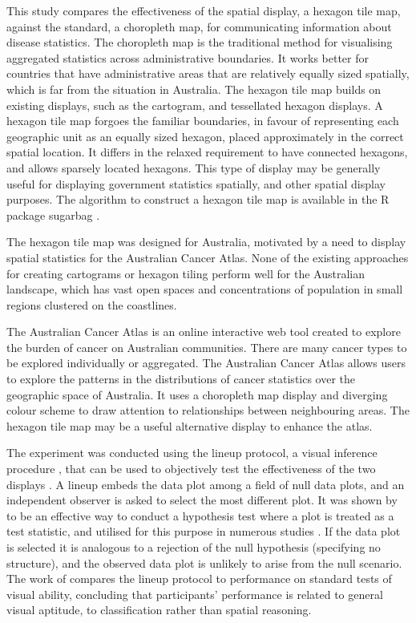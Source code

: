 \documentclass[
doublespace,
  times]{anzsauth}
\begin{document}
This study compares the effectiveness of the spatial display, a hexagon
tile map, against the standard, a choropleth map, for communicating
information about disease statistics. The choropleth map is the
traditional method for visualising aggregated statistics across
administrative boundaries. It works better for countries that have
administrative areas that are relatively equally sized spatially, which
is far from the situation in Australia. The hexagon tile map builds on
existing displays, such as the cartogram, and tessellated hexagon
displays. A hexagon tile map forgoes the familiar boundaries, in favour
of representing each geographic unit as an equally sized hexagon, placed
approximately in the correct spatial location. It differs in the relaxed
requirement to have connected hexagons, and allows sparsely located
hexagons. This type of display may be generally useful for displaying
government statistics spatially, and other spatial display purposes. The
algorithm to construct a hexagon tile map is available in the \textsf{R}
package \textsf{sugarbag} \citep{sugarbag}.

The hexagon tile map was designed for Australia, motivated by a need to
display spatial statistics for the Australian Cancer Atlas. None of the
existing approaches for creating cartograms or hexagon tiling perform
well for the Australian landscape, which has vast open spaces and
concentrations of population in small regions clustered on the
coastlines.

The Australian Cancer Atlas \citep{atlas} is an online interactive web
tool created to explore the burden of cancer on Australian communities.
There are many cancer types to be explored individually or aggregated.
The Australian Cancer Atlas allows users to explore the patterns in the
distributions of cancer statistics over the geographic space of
Australia. It uses a choropleth map display and diverging colour scheme
to draw attention to relationships between neighbouring areas. The
hexagon tile map may be a useful alternative display to enhance the
atlas.

The experiment was conducted using the lineup protocol, a visual
inference procedure \citep{BCHLLSW09, GIIV}, that can be used to
objectively test the effectiveness of the two displays \citep{GTPCCD}. A
lineup embeds the data plot among a field of null data plots, and an
independent observer is asked to select the most different plot. It was
shown by \citet{VVSIALM} to be an effective way to conduct a hypothesis
test where a plot is treated as a test statistic, and utilised for this
purpose in numerous studies \citep{FFS, Green2021, LCTV}. If the data
plot is selected it is analogous to a rejection of the null hypothesis
(specifying no structure), and the observed data plot is unlikely to
arise from the null scenario. The work of \citet{VH2016} compares the
lineup protocol to performance on standard tests of visual ability,
concluding that participants' performance is related to general visual
aptitude, to classification rather than spatial reasoning.
\end{document}
